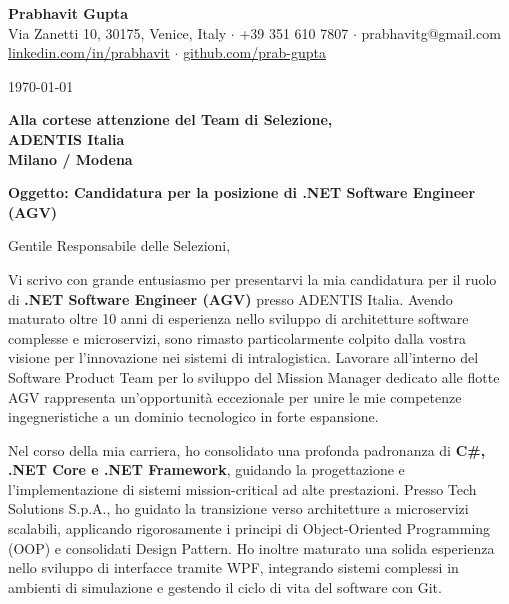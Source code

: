 \documentclass[11pt,a4paper]{article}
\begin{document}
\begin{center}
    {\Huge \textbf{Prabhavit Gupta}} \\
    \vspace{2mm}
    Via Zanetti 10, 30175, Venice, Italy $\cdot$ +39 351 610 7807 $\cdot$ prabhavitg@gmail.com \\
    \href{https://www.linkedin.com/in/prabhavit/}{linkedin.com/in/prabhavit} $\cdot$ \href{https://github.com/prab-gupta}{github.com/prab-gupta}
\end{center}

\vspace{1cm}

\noindent
\today

\vspace{0.5cm}

\noindent
\textbf{Alla cortese attenzione del Team di Selezione,} \\
\textbf{ADENTIS Italia} \\
\textbf{Milano / Modena}

\vspace{0.5cm}

\noindent
\textbf{Oggetto: Candidatura per la posizione di .NET Software Engineer (AGV)}

\vspace{0.5cm}

\noindent
Gentile Responsabile delle Selezioni,

\vspace{0.3cm}

\noindent
Vi scrivo con grande entusiasmo per presentarvi la mia candidatura per il ruolo di \textbf{.NET Software Engineer (AGV)} presso ADENTIS Italia. Avendo maturato oltre 10 anni di esperienza nello sviluppo di architetture software complesse e microservizi, sono rimasto particolarmente colpito dalla vostra visione per l'innovazione nei sistemi di intralogistica. Lavorare all'interno del Software Product Team per lo sviluppo del Mission Manager dedicato alle flotte AGV rappresenta un'opportunità eccezionale per unire le mie competenze ingegneristiche a un dominio tecnologico in forte espansione.

\vspace{0.3cm}

\noindent
Nel corso della mia carriera, ho consolidato una profonda padronanza di \textbf{C\#, .NET Core e .NET Framework}, guidando la progettazione e l'implementazione di sistemi mission-critical ad alte prestazioni. Presso Tech Solutions S.p.A., ho guidato la transizione verso architetture a microservizi scalabili, applicando rigorosamente i principi di Object-Oriented Programming (OOP) e consolidati Design Pattern. Ho inoltre maturato una solida esperienza nello sviluppo di interfacce tramite WPF, integrando sistemi complessi in ambienti di simulazione e gestendo il ciclo di vita del software con Git.
\end{document}
